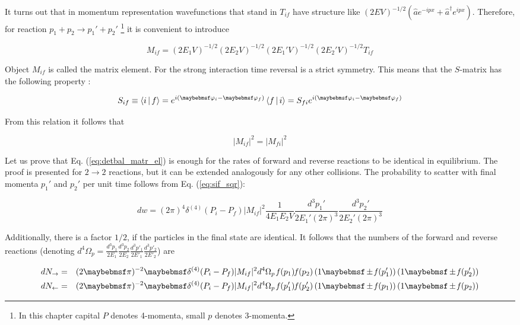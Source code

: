 It turns out that in momentum representation wavefunctions that stand in
$T_{if}$ have structure like $(2 E V)^{-1/2} \left(\hat{a} e^{-ipx}
+\hat{a}^{\dag} e^{ipx}\right)$. Therefore, for reaction $p_1+p_2 \to p_1' +
p_2'$ \footnote{In this chapter capital $P$ denotes 4-momenta, small $p$ denotes 3-momenta.} it is
convenient to introduce

\begin{equation}
  M_{if} = (2 E_1 V)^{-1/2} (2 E_2 V)^{-1/2} (2 E_1' V)^{-1/2} (2 E_2' V)^{-1/2} T_{if}
\end{equation}

Object $M_{if}$ is called the matrix element. For the strong interaction time reversal
is a strict symmetry. This means that the $S$-matrix has the following
 property \cite{Sachs_time_reversal}:

\begin{equation}
   S_{if} \equiv \Braket{i|f} = e^{i(\varphi_i - \varphi_f)} \Braket{f|i} =
   S_{fi} e^{i(\varphi_i - \varphi_f)}
\end{equation}

From this relation it follows that

\begin{equation} \label{eq:detbal_matr_el}
  |M_{if}|^2 = |M_{fi}|^2
\end{equation}

Let us prove that Eq. (\ref{eq:detbal_matr_el}) is enough for the rates
of forward and reverse reactions to be identical in equilibrium. The proof
is presented for $2 \to 2$ reactions, but it can be extended analogously for any other
collisions. The probability to scatter with final momenta $p_1'$ and $p_2'$ per unit
time follows from Eq. (\ref{eq:sif_sqr}):

\begin{equation} \label{eq:scat_prob}
  dw = (2\pi)^4 \delta^{(4)}(P_i-P_f)
       |M_{if}|^2 \frac{1}{4 E_1 E_2 V}
       \frac{d^3p_1'}{2E_1' (2\pi)^3}
       \frac{d^3p_2'}{2E_2' (2\pi)^3}
\end{equation}

Additionally, there is a  factor $1/2$, if the particles in the final state are
identical. It follows that the numbers of the forward and reverse
reactions (denoting $d^4 \Omega_p = \frac{d^3p_1}{2E_1} \frac{d^3p_2}{2E_2}
\frac{d^3p'_1}{2E'_1} \frac{d^3p'_2}{2E'_2}$) are

\begin{align}
  dN_{\rightarrow} &=& (2\pi)^{-2} \delta^{(4)}(P_i-P_f) |M_{if}|^2 d^4 \Omega_p \, \mathit{f}(p_1) \mathit{f}(p_2) \parenths{1 \pm \mathit{f}(p'_1)} \parenths{1 \pm \mathit{f}(p'_2)} \\
  dN_{\leftarrow}  &=& (2\pi)^{-2} \delta^{(4)}(P_i-P_f) |M_{if}|^2 d^4 \Omega_p \, \mathit{f}(p'_1) \mathit{f}(p'_2) \parenths{1 \pm \mathit{f}(p_1)} \parenths{1 \pm \mathit{f}(p_2)}
\end{align}

